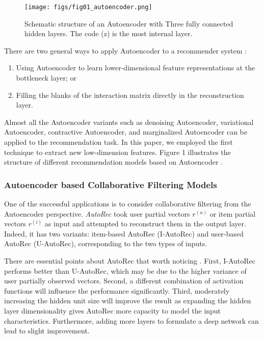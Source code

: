 \documentclass[a4paper,fleqn]{cas-dc}
\begin{document}
\begin{figure}
	\centering
	\texttt{[image: figs/fig01\_autoencoder.png]}
	\caption{Schematic structure of an Autoencoder with Three fully connected hidden layers. The code (z) is the most internal layer.}
	\label{FIG:01}
\end{figure}

There are two general ways to apply Autoencoder to a recommender system \citep{29zhang2019a}:
\begin{enumerate}
	\item Using Autoencoder to learn lower-dimensional feature representations at the bottleneck layer; or
	\item Filling the blanks of the interaction matrix directly in the reconstruction layer.

\end{enumerate}

Almost all the Autoencoder variants such as denoising Autoencoder, variational Autoencoder, contractive Autoencoder, and marginalized Autoencoder can be applied to the recommendation task. In this paper, we employed the first technique to extract new low-dimension features. Figure 1 illustrates the structure of different recommendation models based on Autoencoder \citep{29zhang2019a}.



\subsubsection{Autoencoder based Collaborative Filtering Models}
One of the successful applications is to consider collaborative filtering from the Autoencoder perspective. \textit{AutoRec} \citep{25sedhain2015a} took user partial vectors $r^{(u)}$ or item partial vectors $r^{(i)}$ as input and attempted to reconstruct them in the output layer. Indeed, it has two variants: item-based AutoRec (I-AutoRec) and user-based AutoRec (U-AutoRec), corresponding to the two types of inputs.

There are essential points about AutoRec that worth noticing \citep{29zhang2019a}. First, I-AutoRec performs better than U-AutoRec, which may be due to the higher variance of user partially observed vectors. Second, a different combination of activation functions will influence the performance significantly. Third, moderately increasing the hidden unit size will improve the result as expanding the hidden layer dimensionality gives AutoRec more capacity to model the input characteristics. Furthermore, adding more layers to formulate a deep network can lead to slight improvement.
\end{document}
